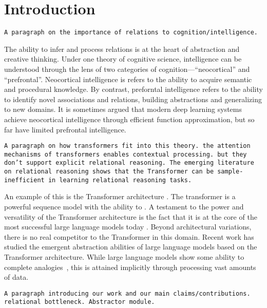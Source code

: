 \section{Introduction}


\texttt{A paragraph on the importance of relations to cognition/intelligence.}

The ability to infer and process relations is at the heart of abstraction and creative thinking. Under one theory of cognitive science, intelligence can be understood through the lens of two categories of cognition---``neocortical'' and ``prefrontal''. Neocortical intelligence is refers to the ability to acquire semantic and procedural knowledge. By contrast, preforntal intelligence refers to the ability to identify novel associations and relations, building abstractions and generalizing to new domains. It is sometimes argued that modern deep learning systems achieve neocortical intelligence through efficient function approximation, but so far have limited prefrontal intelligence.

\texttt{A paragraph on how transformers fit into this theory. the attention mechanisms of transformers enables contextual processing. but they don't support explicit relational reasoning. The emerging literature on relational reasoning shows that the Transformer can be sample-inefficient in learning relational reasoning tasks.}

An example of this is the Transformer architecture \citep{vaswani2017attention}. The transformer is a powerful sequence model with the ability to . A testament to the power and versatility of the Transformer architecture is the fact that it is at the core of the most successful large language models today \citep{gpt3,gpt4,llamma,T5,etc?}. Beyond architectural variations, there is no real competitor to the Transformer in this domain. Recent work has studied the emergent abstraction abilities of large language models based on the Transformer architecture. While large language models show some ability to complete analogies~\citep{}, this is attained implicitly through processing vast amounts of data.

\texttt{A paragraph introducing our work and our main claims/contributions. relational bottleneck. Abstractor module.}

